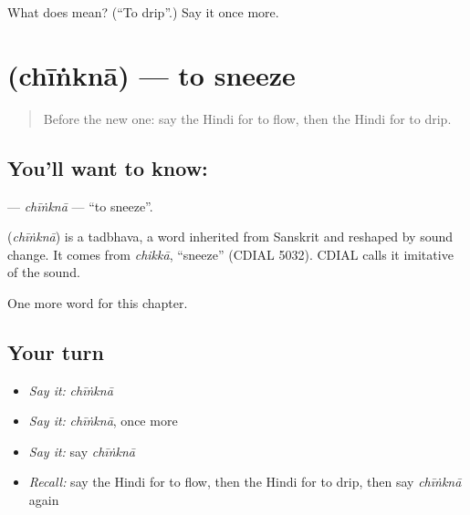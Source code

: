 \begin{tcolorbox}[breakable,colback=teal!4,colframe=teal!35!black,title={Before you move on}]
What does  mean? (\textquotedblleft{}To drip\textquotedblright{}.) Say it once more.
\end{tcolorbox}
\section[\texorpdfstring{\hi{छींकना} (chīṅknā)}{छींकना (chīṅknā)}]{ (chīṅknā) — to sneeze}

\label{lesson:HI-C231-chinkna}



\begin{quote}
Before the new one: say the Hindi for to flow, then the Hindi for to drip.
\end{quote}

\subsection*{You'll want to know: }
\textbf{} — \emph{chīṅknā} — \textquotedblleft{}to sneeze\textquotedblright{}.

\begin{cousinweb}
\textbf{} (\emph{chīṅknā}) is a tadbhava, a word inherited from Sanskrit and reshaped by sound change. It comes from \emph{chikkā}, \textquotedblleft{}sneeze\textquotedblright{} (CDIAL 5032). CDIAL calls it imitative of the sound.
\end{cousinweb}

\begin{grammarlens}[title={What you've built}]
One more word for this chapter.
\end{grammarlens}

\subsection*{Your turn}
\begin{itemize}
\raggedright
  \item \emph{Say it:} \emph{chīṅknā}
  \item \emph{Say it:} \emph{chīṅknā}, once more
  \item \emph{Say it:} say \emph{chīṅknā}
  \item \emph{Recall:} say the Hindi for to flow, then the Hindi for to drip, then say \emph{chīṅknā} again
\end{itemize}

